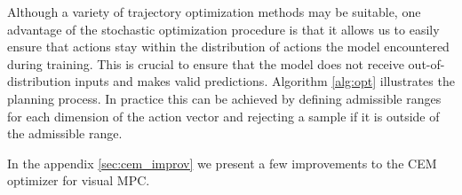 Although a variety of trajectory optimization methods may be suitable, one advantage of the stochastic optimization procedure is that it allows us to easily ensure that actions stay within the distribution of actions the model encountered during training. This is crucial to ensure that the model does not receive out-of-distribution inputs and makes valid predictions.  Algorithm \ref{alg:opt} illustrates the planning process. In practice this can be achieved by defining admissible ranges for each dimension of the action vector and rejecting a sample if it is outside of the admissible range. 

In the appendix \ref{sec:cem_improv} we present a few improvements to the CEM optimizer for visual MPC.
